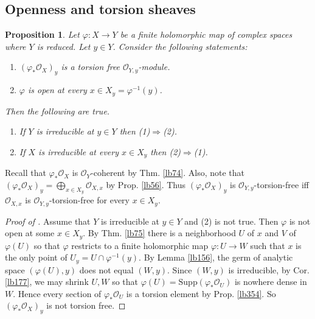 \documentclass[12pt,b5paper,notitlepage]{report}
\theoremstyle{definition}
\theoremstyle{plain}
\newtheorem{pp}[df]{Proposition}
\newcommand{\scr}{\mathscr}
\newcommand{\Supp}{\mathrm{Supp}}
\numberwithin{equation}{section}
\begin{document}
\subsection{Openness and torsion sheaves}



\begin{pp}\label{lb169}
Let $\varphi:X\rightarrow Y$ be a finite holomorphic map of complex spaces where $Y$ is reduced. Let $y\in Y$. Consider the following statements:
\begin{enumerate}[label=(\arabic*)]
\item $(\varphi_*\scr O_X)_y$ is a torsion free $\scr O_{Y,y}$-module.
\item $\varphi$ is open at every $x\in X_y=\varphi^{-1}(y)$. 
\end{enumerate}
Then the following are true.
\begin{enumerate}[label=\boxed{\Alph*}]
\item If $Y$ is irreducible at $y\in Y$ then (1)$\Rightarrow$(2).
\item If $X$ is irreducible at every $x\in X_y$ then (2)$\Rightarrow$(1).
\end{enumerate}
\end{pp}




Recall that $\varphi_*\scr O_X$ is $\scr O_Y$-coherent by Thm. \ref{lb74}. Also, note that $(\varphi_*\scr O_X)_y=\bigoplus_{x\in X_y}\scr O_{X,x}$ by Prop. \ref{lb56}. Thus $(\varphi_*\scr O_X)_y$ is $\scr O_{Y,y}$-torsion-free iff $\scr O_{X,x}$ is $\scr O_{Y,y}$-torsion-free for every $x\in X_y$.


\begin{proof}[Proof of ]
Assume that $Y$ is irreducible at $y\in Y$ and (2) is not true. Then $\varphi$ is not open at some $x\in X_y$. By Thm. \ref{lb75} there is a neighborhood $U$ of $x$ and $V$ of $\varphi(U)$ so that $\varphi$ restricts to a finite holomorphic map $\varphi:U\rightarrow W$ such that $x$ is the only point of $U_y=U\cap\varphi^{-1}(y)$. By Lemma \ref{lb156}, the germ of analytic space $(\varphi(U),y)$ does not equal $(W,y)$. Since $(W,y)$ is irreducible, by Cor. \ref{lb177}, we may shrink $U,W$ so that $\varphi(U)=\Supp(\varphi_*\scr O_U)$ is nowhere dense in $W$. Hence every section of $\varphi_*\scr O_U$ is a torsion element by Prop. \ref{lb354}. So $(\varphi_*\scr O_X)_y$ is not torsion free.
\end{proof}
\end{document}

